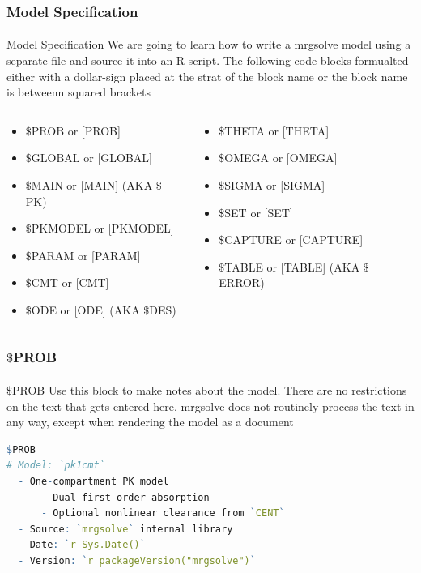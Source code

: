\documentclass[
	11pt, %
]{beamer}
\begin{document}
\begin{frame}
	\frametitle{Model Specification}
	\framesubtitle{} %
	\begin{block}{Model Specification}
	\small
	We are going to learn how to write a mrgsolve model using a separate file and source it into an R script. The following code blocks formualted either with a dollar-sign placed at the strat of the block name  or the block name is betweenn squared brackets 
\end{block}
\tiny
\begin{columns}[c] 
		\begin{column}{0.5\textwidth}
		\begin{itemize}
	 \item $\$$PROB or [PROB]
	 \item $\$$GLOBAL or [GLOBAL]
	 \item $\$$MAIN or [MAIN] (AKA $\$$PK)
	 \item $\$$PKMODEL or [PKMODEL]	 
	 \item $\$$PARAM or [PARAM]
	 \item $\$$CMT or [CMT]
	 \item $\$$ODE or [ODE] (AKA $\$$DES)
	 \end{itemize}
	\end{column}
		\begin{column}{0.5\textwidth} %
   \begin{itemize}
	 \item $\$$THETA or [THETA]
	 \item $\$$OMEGA or [OMEGA]
	 \item $\$$SIGMA or [SIGMA]
	 \item $\$$SET or [SET]
	 \item $\$$CAPTURE or [CAPTURE]
	 \item $\$$TABLE or [TABLE] (AKA $\$$ERROR)
	\end{itemize}
		\end{column}
	\end{columns}


\end{frame}




\begin{frame}[fragile]
	\frametitle{$\$$PROB}
	\framesubtitle{} %
	\begin{block}{$\$$PROB}
	\small
	Use this block to make notes about the model. There are no restrictions on the text that gets entered here. mrgsolve does not routinely process the text in any way, except when rendering the model as a document

\begin{lstlisting}[language=R]
$PROB
# Model: `pk1cmt`
  - One-compartment PK model
      - Dual first-order absorption
      - Optional nonlinear clearance from `CENT`
  - Source: `mrgsolve` internal library
  - Date: `r Sys.Date()`
  - Version: `r packageVersion("mrgsolve")`
\end{lstlisting}
	\end{block}

\end{frame}
\end{document}
